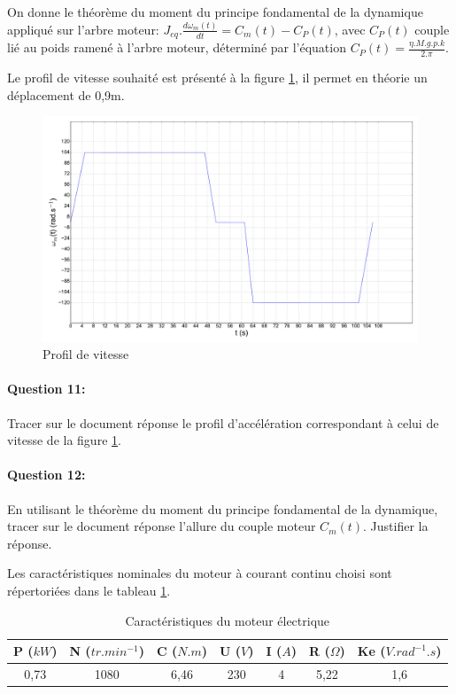 On donne le théorème du moment du principe fondamental de la dynamique appliqué sur l'arbre moteur: $J_{eq}.\frac{d\omega_m(t)}{dt}=C_m(t)-C_P(t)$, avec $C_P(t)$ couple lié au poids ramené à l'arbre moteur, déterminé par l'équation $C_P(t)=\frac{\eta.M.g.p.k}{2.\pi}$.

Le profil de vitesse souhaité est présenté à la figure \ref{profil}, il permet en théorie un déplacement de 0,9m.

\begin{figure}[!h]
\centering
 \includegraphics[width=0.9\linewidth]{img/profil}
\caption{Profil de vitesse}
\label{profil}
\end{figure}

\paragraph{Question 11:} Tracer sur le document réponse le profil d'accélération correspondant à celui de vitesse de la figure \ref{profil}.

\paragraph{Question 12:} En utilisant le théorème du moment du principe fondamental de la dynamique, tracer sur le document réponse l'allure du couple moteur $C_m(t)$. Justifier la réponse.

Les caractéristiques nominales du moteur à courant continu choisi sont répertoriées dans le tableau \ref{moteur}.

\begin{table}[!h]
\centering
\begin{tabular}{|c|c|c|c|c|c|c|}
\hline
P ($kW$) & N ($tr.min^{-1}$) & C ($N.m$) & U ($V$) & I ($A$) & R ($\Omega$) & Ke ($V.rad^{-1}.s$)\\
\hline
0,73 & 1080 & 6,46 & 230 & 4 & 5,22 & 1,6 \\
\hline
\end{tabular}
\caption{Caractéristiques du moteur électrique}
\label{moteur}
\end{table}

